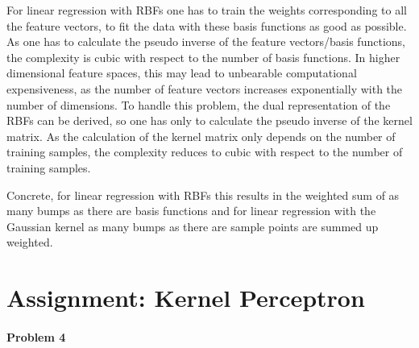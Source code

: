 \documentclass{article}
\begin{document}
For linear regression with RBFs one has to train the weights corresponding to all the feature vectors, to fit the data  with these basis functions as good as possible. As one has to calculate the pseudo inverse of the feature vectors/basis functions, the complexity is cubic with respect to the number of basis functions. In higher dimensional feature spaces, this may lead to unbearable computational expensiveness, as the number of feature vectors increases exponentially with the number of dimensions. To handle this problem, the dual representation of the RBFs can be derived, so one has only to calculate the pseudo inverse of the kernel matrix. As the calculation of the kernel matrix only depends on the number of training samples, the complexity reduces to cubic with respect to the number of training samples.

Concrete, for linear regression with RBFs this results in the weighted sum of as many bumps as there are basis functions and for linear regression with the Gaussian kernel as many bumps as there are sample points are summed up weighted.


\section{Assignment: Kernel Perceptron}
\paragraph*{Problem 4}
$\;$ 
\end{document}
